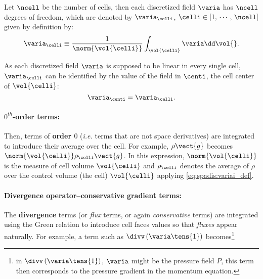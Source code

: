 Let $\ncell$ be the number of cells, then each discretized field $\varia$ has $\ncell$ degrees of freedom,
which are denoted by $\varia_\celli$, $\celli \in \left[ 1 , \, \cdots , \, \ncell \right]$ given by definition by:
\begin{equation}\label{eq:spadis:variai_def}
\varia_\celli \equiv \dfrac{1}{\norm{\vol{\celli}}}\int_{\vol{\celli}} \varia \dd \vol{}.
\end{equation}

As each discretized field $\varia$ is supposed to be linear in every single cell, $\varia_\celli$ can be identified
by the value of the field in $\centi$, the cell center of $\vol{\celli}$:
\begin{equation}\label{eq:spadis:variai_id}
\varia_\centi = \varia_\celli.
\end{equation}

\paragraph{$0^{th}$-order terms:}
Then, terms of \textbf{order $0$} (\emph{i.e.} terms that are not space
derivatives) are integrated to introduce their average over the cell. For
example, $\rho \vect{g}$ becomes $\norm{\vol{\celli}} \rho_{\celli} \vect{g}$. 
In this expression, $\norm{\vol{\celli}}$ is the measure of cell volume $\vol{\celli}$ and 
$\rho_{\celli}$ denotes the average of $\rho $ over the control volume
(the cell) $\vol{\celli}$ applying \eqref{eq:spadis:variai_def}. 

\paragraph{Divergence operator--conservative gradient terms:}
The \textbf{divergence} terms (or \emph{flux} terms, or again \emph{conservative}
terms) are integrated using the Green relation to introduce cell faces
values so that \emph{fluxes} appear naturally. For example, a term such as 
$\divv \left( \varia \tens{1}\right)$ becomes\footnote{%
in $\divv \left( \varia \tens{1}\right)$, $\varia$ might be the pressure field $P$, this term then corresponds to the pressure gradient
in the momentum equation.
}%


